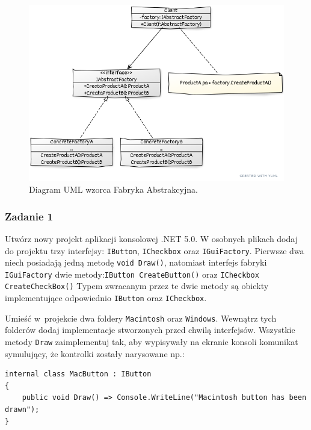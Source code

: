 \begin{figure}[hbt!]
	\centering
	\includegraphics[width=0.9\linewidth]{images/AbstractFactoryUml}
	\caption{Diagram UML wzorca Fabryka Abstrakcyjna.}
	\label{lab2/fig/AbstractFactoryUml}
\end{figure}
%


\subsubsection{Zadanie 1}

Utwórz nowy projekt aplikacji konsolowej .NET 5.0. W osobnych plikach dodaj do projektu trzy interfejsy: \texttt{IButton}, \texttt{ICheckbox} oraz \texttt{IGuiFactory}. Pierwsze dwa niech posiadają jedną metodę \texttt{void Draw()}, natomiast interfejs fabryki \texttt{IGuiFactory} dwie metody:\texttt{IButton CreateButton()} oraz \texttt{ICheckbox CreateCheckBox()} Typem zwracanym przez te dwie metody są obiekty implementujące odpowiednio \texttt{IButton} oraz \texttt{ICheckbox}.

Umieść w~projekcie dwa foldery \texttt{Macintosh} oraz \texttt{Windows}. Wewnątrz tych folderów dodaj implementacje stworzonych przed chwilą interfejsów. Wszystkie metody \texttt{Draw} zaimplementuj tak, aby wypisywały na ekranie konsoli komunikat symulujący, że kontrolki zostały narysowane np.:
\begin{lstlisting}
internal class MacButton : IButton
{
	public void Draw() => Console.WriteLine("Macintosh button has been drawn");
}
\end{lstlisting}


